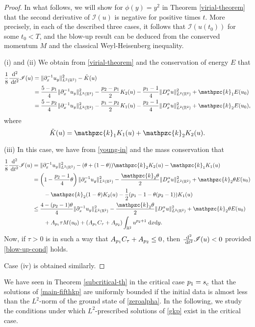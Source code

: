 \documentclass[10pt]{article}
\numberwithin{equation}{section}
\newcommand{\nii}{\mathscr{I}}
\newcommand{\ps}{\mathpzc{k}}
\newcommand{\lt}{{L^2(\mathbb{R}^2)}}
\newcommand{\dd}{\;{\rm d}}
\newcommand{\dz}{\;{\rm d}x{\rm d}y}
\newcommand{\nd}{{\partial_x^{-1}}}
\newcommand{\dx}{D_x^{\alpha}}
\newcommand{\rt}{{\mathbb{R}^2}}
\begin{document}
	\begin{proof}
		In what follows, we will show for $\phi(y)=y^2$ in Theorem \ref{virial-theorem} that the second derivative of $\nii(u)$  is negative for positive
		times $t$. More precisely, in each of the described three cases,  it follows that $\nii(u(t_0))$ for some $t_0 <T$, and the blow-up result can be
		deduced from the conserved momentum $M$ and the classical Weyl-Heisenberg inequality.
		
		(i) and (ii) We obtain  from \eqref{virial-theorem} and  the conservation of energy $E$ that
		\[
		\begin{split}
			\frac{1}{8}\frac{\dd^2}{\dd t^2}\nii (u)&=\|\nd u_y\|_\lt^2-\tilde{K}(u)\\
			&=\frac{5-\po}{4}\|\nd u_y\|_\lt^2-
			\frac{\poo-\po}{2}K_2(u) 
			-\frac{\po-1}{4}\|\dx u\|_\lt^2
			+\ps_1E(u_0)
			\\
			&=
			\frac{5-\poo}{4}\|\nd u_y\|_\lt^2-
			\frac{\po -\poo}{2 } K_1(u)
			-\frac{\poo-1}{4}\|\dx u\|_\lt^2
			+\ps_2E(u_0),
		\end{split}
		\]
		where
		\begin{equation}\label{ktilde}
			\tilde{K}(u)=\ps_1K_1(u)+ \ps_2K_2(u).
		\end{equation} 
		
		(iii)
		In this case, we have from \eqref{young-in} and the mass conservation that 
		\[
		\begin{split}
			\frac{1}{8}\frac{\dd^2}{\dd t^2}\nii (u)&
			=\|\nd u_y\|_\lt^2
			- (\theta+(1-\theta)) \ps_2 K_2(u)- \ps_1 K_1(u)\\
			&=\left(1-\frac{\poo-1}{4}\theta\right)\|\nd u_y\|_\lt^2 -\frac{\ps_2\theta}{2}\|\dx u\|_\lt^2
			+\ps_2\theta E(u_0)\\
			&\qquad
			-\ps_2(1-\theta)K_2(u)
			-\frac{1}{2}(\po-1-\theta(\poo-1))K_1(u)\\
			&\leq 
			\frac{4-(\poo-1)\theta}{4}\|\nd u_y\|_\lt^2
			-\frac{\ps_2\theta}{2}\|\dx u\|_\lt^2
			+\ps_2\theta E(u_0)\\
			&\qquad +A_{\po}\tau M(u_0)+(A_{\po}C_\tau+ A_\poo )\int_\rt u^{\poo+1}\dz.
		\end{split}
		\]
		Now, if  $\tau>0$ is in such a way that $A_{{p_1}}C_\tau+ A_{p_2}\leq0$, then $\frac{\dd^2}{\dd t^2}\nii (u)<0$ provided \eqref{blow-up-cond} holds.
		
		Case (iv) is obtained similarly.
	\end{proof}	
	
	
	
	
	We have seen in Theorem \ref{subcritical-th} in the critical case ${p_1}=s_c$ that the solutions of \eqref{main-fifthkp} are uniformly bounded if the initial data is almost less than the $L^2$-norm of the ground state of \eqref{zeroalpha}. In the following, we study the conditions under which  $L^2$-prescribed solutions of \eqref{gkp} exist in the critical case.
	
\end{document}
